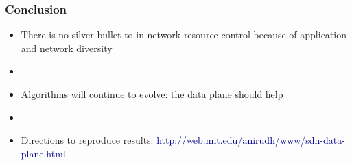 \begin{Large}
\begin{frame}[plain]

\frametitle{Conclusion}
\begin{itemize}

\item There is no silver bullet to in-network resource control because
  of application and network diversity

\item[]
\item Algorithms will continue to evolve: the data plane should help

\item[]
\item Directions to reproduce results: \textcolor{DarkBlue}{http://web.mit.edu/anirudh/www/sdn-data-plane.html} 

\end{itemize}
\end{frame}



\end{Large}
